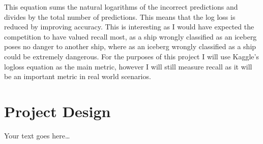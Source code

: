 \documentclass{article}
\begin{document}
This equation sums the natural logarithms of the incorrect predictions and divides by the total number of predictions. This means that the log loss is reduced by improving accuracy. This is interesting as I would have expected the competition to have valued recall most, as a ship wrongly classified as an iceberg poses no danger to another ship, where as an iceberg wrongly classified as a ship could be extremely dangerous. For the purposes of this project I will use Kaggle's logloss equation as the main metric, however I will still measure recall as it will be an important metric in real world scenarios. 

\section{Project Design}



Your text goes here…


{}
\end{document}
